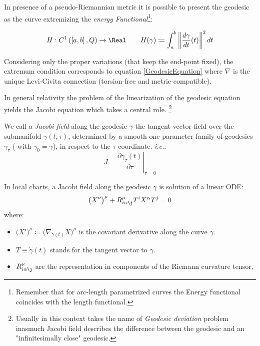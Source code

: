 \documentclass[Main]{subfiles}
\begin{document}
	\vspace{4mm}
	In presence of a pseudo-Riemannian metric it is possible to present the geodesic %
	as the curve extremizing the \emph{energy Functional}\footnote{Remember that for arc-length parametrized curves the Energy functional coincides with the length functional.\cite[Lemma $1.4.2$ ]{Jost2005}}:
	\begin{definition}
  	\begin{equation}\label{EnergyFunctional}
  		H: C^1\left(\left[a,b\right],Q\right) \rightarrow \Real \qquad
 		H(\gamma) \coloneqq \int_a^b \left\Vert \frac{d \gamma}{dt} (t)\right\Vert^2 dt
 	\end{equation}
\end{definition} 	
	Considering only the proper variations (that keep the end-point fixed), the extremum condition corresponds to equation \ref{GeodesicEquation} where $\nabla$ is the unique Levi-Civita connection (torsion-free and metric-compatible).\cite{Jost2005}

	\vspace{4mm}
	In general relativity the problem of the 
	linearization of the geodesic equation yields the Jacobi equation which takes
	 a central role. \footnote{Usually in this context takes the name of \emph{Geodesic deviation} problem\cite[pag. 46]{Wald1984} inasmuch Jacobi field describes the difference between the geodesic and an "infinitesimally close" geodesic.}
	
	\begin{definition}
	We call a \emph{Jacobi field} along the geodesic $\gamma$ the tangent vector field over the submanifold $\gamma(t,\tau)$, determined by  a smooth one parameter family of geodesics $ \gamma_\tau$ ( with $\gamma_0=\gamma$), in respect to the $\tau$ coordinate. \textit{i.e.}:
	\begin{displaymath}
	 J = \left. \frac{\partial \gamma_\tau (t)}{\partial \tau}\right\rvert_{\tau=0}
	\end{displaymath}
	\end{definition}
	
		In local charts, a Jacobi field along the geodesic $\gamma$ is solution of a linear ODE:
		\begin{equation}\label{JacobiEquationComponents}
			\big( X''\big)^\mu + R^\mu_{i \alpha \j} T^i X^\alpha T^j =0
		\end{equation}
		where:
		\begin{itemize}
			\item $\big(X'\big)^\mu \coloneqq \big( \nabla_{\dot{\gamma}(t)} X\big)^\mu$ is the covariant derivative along the curve $\gamma$.
			\item $T \equiv \dot{\gamma}(t)$ stands for the tangent vector to $\gamma$.
			\item $R^\mu_{i \alpha \j}$ are the representation in components of the Riemann curvature tensor,
		\end{itemize}
\end{document}
